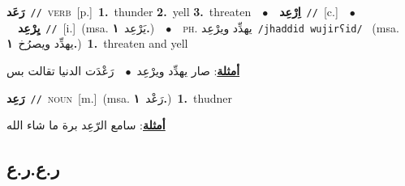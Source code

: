 \documentclass[10pt,a4paper,twoside]{article} %
\begin{document}
\begin{multicols}{2}
{\setlength\topsep{0pt}\textbf{\foreignlanguage{arabic}{رَعَد}}\ {\color{gray}\texttt{//}\color{black}}\ \textsc{verb}\ [p.]\ \textbf{1.}~thunder  \textbf{2.}~yell  \textbf{3.}~threaten\ \ $\bullet$\ \ \setlength\topsep{0pt}\textbf{\foreignlanguage{arabic}{اِرْعِد}}\ {\color{gray}\texttt{//}\color{black}}\ [c.]\ \ $\bullet$\ \ \setlength\topsep{0pt}\textbf{\foreignlanguage{arabic}{يِرْعِد}}\ {\color{gray}\texttt{//}\color{black}}\ [i.]\ \color{gray}(msa. \foreignlanguage{arabic}{يَرْعِد}~\foreignlanguage{arabic}{\textbf{١.}})\color{black}\ \ $\bullet$\ \ \textsc{ph.} \color{gray} \foreignlanguage{arabic}{يهدِّد ويرْعِد}\color{black}\ {\color{gray}\texttt{/{\sffamily jhaddid wujirʕid}/}\color{black}}\ \color{gray} (msa. \foreignlanguage{arabic}{يهدِّد ويصرُخ}~\foreignlanguage{arabic}{\textbf{١.}})\color{black}\ \textbf{1.}~threaten and yell\  \begin{flushright}\color{gray}\foreignlanguage{arabic}{\textbf{\underline{\foreignlanguage{arabic}{أمثلة}}}: صار يهدِّد ويرْعِد\ $\bullet$\ \  رَعْدَت الدنيا تقالت بس}\end{flushright}\color{black}} \vspace{2mm}

{\setlength\topsep{0pt}\textbf{\foreignlanguage{arabic}{رَعِد}}\ {\color{gray}\texttt{//}\color{black}}\ \textsc{noun}\ [m.]\ \color{gray}(msa. \foreignlanguage{arabic}{رَعْد}~\foreignlanguage{arabic}{\textbf{١.}})\color{black}\ \textbf{1.}~thudner\  \begin{flushright}\color{gray}\foreignlanguage{arabic}{\textbf{\underline{\foreignlanguage{arabic}{أمثلة}}}: سامع الرّعِد برة ما شاء الله}\end{flushright}\color{black}} \vspace{2mm}

\vspace{-3mm}
\subsection*{\color{blue}\foreignlanguage{arabic}{ر.ع.ر.ع}\color{blue}{}} 


\end{multicols}
\end{document}
